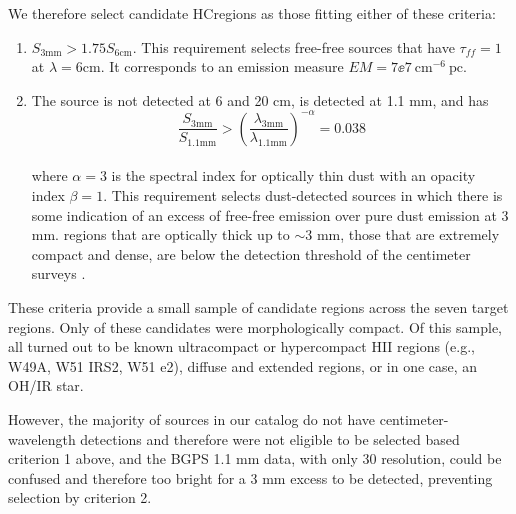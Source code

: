 \documentclass[twocolumn]{aastex62}
\begin{document}
We therefore select candidate HC\hii regions
as those fitting either of these criteria:
\begin{enumerate}
    \item $S_{3 \mathrm{mm}} > 1.75 S_{6 \mathrm{cm}}$.  %
        This requirement selects free-free sources that have $\tau_{ff}=1$
        at $\lambda = {6 \mathrm{cm}}$.  It corresponds to an emission
        measure ${EM=7\ee{7}~\mathrm{cm}^{-6}~\mathrm{pc}}$.
    \item
        The source is not detected at 6 and 20 cm, is detected at 1.1 mm, and has
        \begin{equation}
            \frac{S_{3 \mathrm{mm}}}{S_{1.1 \mathrm{mm}}} > \left(\frac{\lambda_{3 \mathrm{mm}}}
            {\lambda_{1.1 \mathrm{mm}}}\right)^{-\alpha} = 0.038
        \end{equation}\\
        where $\alpha=3$ is the spectral
        index for optically thin dust with an opacity index $\beta=1$.  This
        requirement selects dust-detected sources in which there is some
        indication of an excess of free-free emission over pure dust emission
        at 3 mm.
        \hchii regions that are optically
        thick up to $\sim3$ mm, those that are extremely compact and dense,
        are below the detection threshold of the centimeter surveys
        \citep[$\approx2.5$ mJy at 6 cm;][]{Giveon2005a,Hoare2012a}.
\end{enumerate}

These criteria provide a small sample of \nhiicand candidate \hchii regions
across the seven target regions.  Only \ncompacthiicand of these candidates
were morphologically compact. Of this sample, all turned out to be known
ultracompact or hypercompact HII regions (e.g., W49A, W51 IRS2, W51 e2),
diffuse and extended regions, or in one case, an OH/IR star. 

However, the majority of sources in our catalog do not have
centimeter-wavelength detections and therefore were not
eligible to be selected based criterion 1 above, and the BGPS 1.1 mm data,
with only 30 \arcsec resolution, could be confused and therefore too bright for
a 3 mm excess to be detected, preventing selection by criterion 2. 
\end{document}
